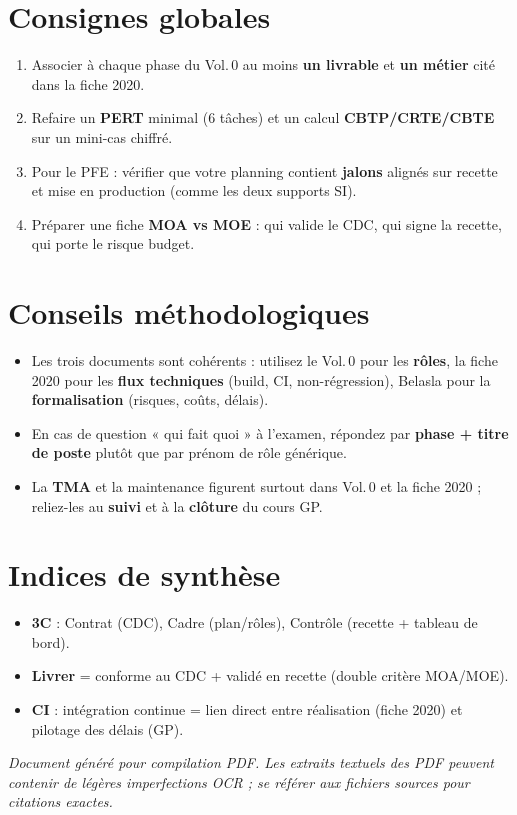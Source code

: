 \documentclass[11pt,a4paper]{article}
\begin{document}
\section{Consignes globales}
\begin{enumerate}
  \item Associer à chaque phase du Vol.\,0 au moins \textbf{un livrable} et \textbf{un métier} cité dans la fiche 2020.
  \item Refaire un \textbf{PERT} minimal (6 tâches) et un calcul \textbf{CBTP/CRTE/CBTE} sur un mini-cas chiffré.
  \item Pour le PFE : vérifier que votre planning contient \textbf{jalons} alignés sur recette et mise en production (comme les deux supports SI).
  \item Préparer une fiche \textbf{MOA vs MOE} : qui valide le CDC, qui signe la recette, qui porte le risque budget.
\end{enumerate}

\section{Conseils méthodologiques}
\begin{itemize}[nosep]
  \item Les trois documents sont cohérents : utilisez le Vol.\,0 pour les \textbf{rôles}, la fiche 2020 pour les \textbf{flux techniques} (build, CI, non-régression), Belasla pour la \textbf{formalisation} (risques, coûts, délais).
  \item En cas de question « qui fait quoi » à l'examen, répondez par \textbf{phase + titre de poste} plutôt que par prénom de rôle générique.
  \item La \textbf{TMA} et la maintenance figurent surtout dans Vol.\,0 et la fiche 2020 ; reliez-les au \textbf{suivi} et à la \textbf{clôture} du cours GP.
\end{itemize}

\section{Indices de synthèse}
\begin{itemize}[nosep]
  \item \textbf{3C} : Contrat (CDC), Cadre (plan/rôles), Contrôle (recette + tableau de bord).
  \item \textbf{Livrer} = conforme au CDC + validé en recette (double critère MOA/MOE).
  \item \textbf{CI} : intégration continue = lien direct entre réalisation (fiche 2020) et pilotage des délais (GP).
\end{itemize}

\vfill
\noindent\textit{Document généré pour compilation PDF. Les extraits textuels des PDF peuvent contenir de légères imperfections OCR ; se référer aux fichiers sources pour citations exactes.}
\end{document}
